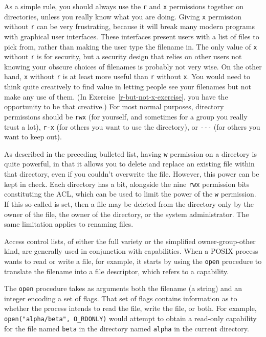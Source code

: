 As a simple rule, you should always use the \texttt{r} and \texttt{x} permissions
together on directories, unless you really know what you are doing.
Giving \texttt{x} permission without \texttt{r} can be very frustrating, because it will
break many modern programs with graphical user interfaces. These interfaces
present users with a list of files to pick from, rather than making
the user type the filename in.  The only value of \texttt{x} without \texttt{r} is for
security, but a security design that relies on other users not knowing
your obscure choices of filenames is probably not very wise.  On the
other hand, \texttt{x} without \texttt{r} is at least more useful than \texttt{r} without \texttt{x}.  You
would need to think quite creatively to find value in letting people
see your filenames but not make any use of them.  (In
Exercise~\ref{r-but-not-x-exercise}, you have the opportunity to be
that creative.)  For most normal
purposes, directory permissions should be \verb|rwx| (for yourself,
and sometimes for a group you really trust a lot), \verb|r-x| (for others you
want to use the directory), or \verb|---| (for others you want to keep
out).

As described in the preceding bulleted list, having \texttt{w} permission on a
directory is quite powerful, in that it allows you to delete and
replace an existing file within
that directory, even if you couldn't overwrite the file.  However,
this power can be kept in check.  Each directory has a bit, alongside the
nine \texttt{rwx} permission bits constituting the ACL, which can be used to limit the
power of the \texttt{w} permission.  If this so-called  is
set, then a file may be deleted from the directory only by the owner
of the file, the owner of the directory, or the system administrator.
The same limitation applies to renaming files.

Access control lists, of either the full variety or the simplified
owner-group-other kind, are generally used in conjunction with
capabilities.  When a POSIX process wants to read or write a file, for
example, it starts by using the \verb|open| procedure to translate the
filename into a file descriptor, which refers to a capability.

The \verb|open| procedure takes as arguments both the filename (a
string) and an integer encoding a set of flags.  That set of flags
contains information as to whether the process intends to read the
file, write the file, or both.  For example,
\verb|open("alpha/beta", O_RDONLY)| would attempt to obtain a read-only
capability for the file named \verb|beta| in the directory named
\verb|alpha| in the current directory.


